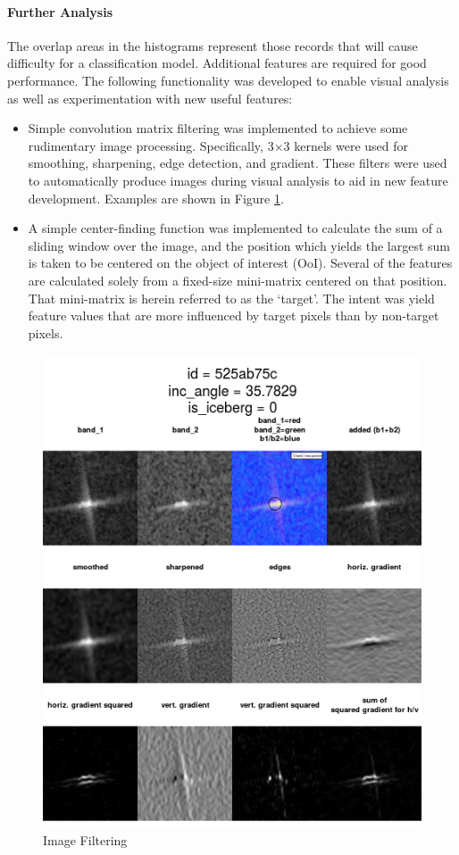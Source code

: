 \documentclass[fleqn,10pt]{SelfArx} %
\begin{document}
\paragraph{Further Analysis} The overlap areas in the histograms represent those records that will cause difficulty for a classification model. Additional features are required for good performance.  The following functionality was developed to enable visual analysis as well as experimentation with new useful features:

\begin{itemize}
	\item Simple convolution matrix filtering was implemented to achieve some rudimentary image processing.  Specifically, 3$\times$3 kernels were used for smoothing, sharpening, edge detection, and gradient. \cite{polarimetric} These filters were used to automatically produce images during visual analysis to aid in new feature development.  Examples are shown in Figure \ref{filtering}.
	
	\item A simple center-finding function was implemented to calculate the sum of a sliding window over the image, and the position which yields the largest sum is taken to be centered on the object of interest (OoI).  Several of the features are calculated solely from a fixed-size mini-matrix centered on that position.  That mini-matrix is herein referred to as the `target'.  The intent was yield feature values that are more influenced by target pixels than by non-target pixels.
\end{itemize}

\begin{figure}\centering
	\includegraphics[width=.9\linewidth]{iceberg/analysis/525ab75c.png}
	\caption{Image Filtering}\label{filtering}
\end{figure}
\end{document}
